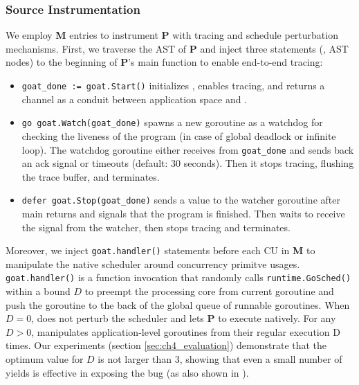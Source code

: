 \subsubsection{Source Instrumentation}

We employ \textbf{M} entries to instrument \textbf{P} with tracing and schedule perturbation mechanisms.
%
First, we traverse the AST of \textbf{P} and inject three statements (\ie, AST nodes) to the beginning of \textbf{P}'s main function to enable end-to-end tracing:
\begin{itemize}
  \item \texttt{goat\_done := goat.Start()} initializes \goat, enables tracing, and returns a channel as a conduit between application space and \goat.
  \item \texttt{go goat.Watch(goat\_done)} spawns a new goroutine as a watchdog for checking the liveness of the program (in case of global deadlock or infinite loop). The watchdog goroutine either receives from \texttt{goat\_done} and sends back an ack signal or timeouts (default: 30 seconds). Then it stops tracing, flushing the trace buffer, and terminates.
  \item \texttt{defer goat.Stop(goat\_done)} sends a value to the watcher goroutine after main returns and signals that the program is finished. Then \goat waits to receive the signal from the watcher, then stops tracing and terminates.
\end{itemize}

Moreover, we inject \texttt{goat.handler()} statements before each CU in \textbf{M} to manipulate the native scheduler around concurrency primitve usages. \texttt{goat.handler()} is a function invocation that randomly calls \texttt{runtime.GoSched()} within a bound $D$ to preempt the processing core from current goroutine and push the goroutine to the back of the global queue of runnable goroutines.
%
When $D=0$, \goat does not perturb the scheduler and lets \textbf{P} to execute natively. For any $D>0$, \goat manipulates application-level goroutines from their regular execution D times.
%
Our experiments (section \ref{sec:ch4_evaluation}) demonstrate that the optimum value for $D$ is not larger than 3, showing that even a small number of yields is effective in exposing the bug (as also shown in \cite{burckhardt-depthBug-asplos10}).

